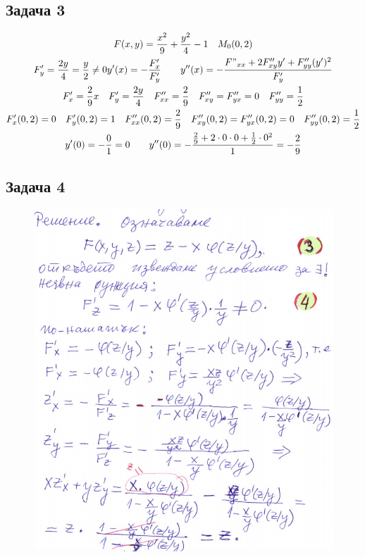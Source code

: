 \documentclass[a4paper,fleqn,12pt]{article}
\theoremstyle{definition}
\begin{document}
\subsection*{Задача 3}
\begin{gather*}
F(x,y) = \frac{x^2}{9} + \frac{y^2}{4} - 1 \quad M_0(0,2)\\
F'_y = \frac{2y}{4} = \frac{y}{2} \neq 0 
y'(x) = - \frac{F'_x}{F'_y} \qquad y''(x) = - \frac{F"_{xx} + 2F''_{xy}y' + F''_{yy}(y')^2}{F'_y}\\
F'_x = \frac{2}{9} x \quad F'_y = \frac{2y}{4} \quad F''_{xx} = \frac{2}{9} \quad F''_{xy} = F''_{yx} = 0 \quad F''_{yy} = \frac{1}{2} \\
F'_x(0,2) = 0 \quad F'_y(0,2) = 1 \quad F''_{xx}(0,2) = \frac{2}{9} \quad F''_{xy}(0,2) = F''_{yx}(0,2) = 0 \quad F''_{yy}(0,2) = \frac{1}{2} \\
y'(0) = - \frac{0}{1} = 0 \qquad y''(0) = - \frac{\frac{2}{9} + 2 \cdot 0 \cdot 0 + \frac{1}{2} \cdot 0^2}{1} = - \frac{2}{9}
\end{gather*}

\subsection*{Задача 4}
\begin{figure}[htp!]
  \includegraphics{Pics/calc/ex7-task4.png}
\end{figure}
\end{document}
